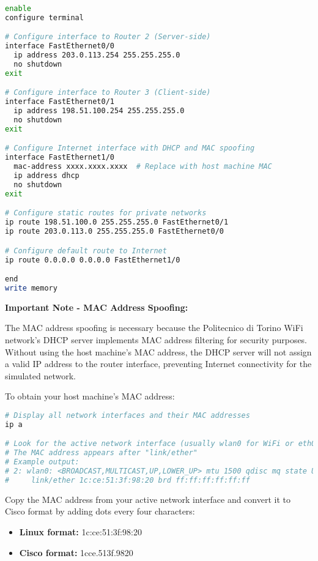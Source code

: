 \begin{lstlisting}[language=bash]
enable
configure terminal

# Configure interface to Router 2 (Server-side)
interface FastEthernet0/0
  ip address 203.0.113.254 255.255.255.0
  no shutdown
exit

# Configure interface to Router 3 (Client-side)  
interface FastEthernet0/1
  ip address 198.51.100.254 255.255.255.0
  no shutdown
exit

# Configure Internet interface with DHCP and MAC spoofing
interface FastEthernet1/0
  mac-address xxxx.xxxx.xxxx  # Replace with host machine MAC
  ip address dhcp
  no shutdown
exit

# Configure static routes for private networks
ip route 198.51.100.0 255.255.255.0 FastEthernet0/1
ip route 203.0.113.0 255.255.255.0 FastEthernet0/0

# Configure default route to Internet
ip route 0.0.0.0 0.0.0.0 FastEthernet1/0

end
write memory
\end{lstlisting}

\noindent
\textbf{Important Note - MAC Address Spoofing:} 

\noindent
The MAC address spoofing is necessary because the Politecnico di Torino WiFi network's DHCP server implements MAC address filtering for security purposes. Without using the host machine's MAC address, the DHCP server will not assign a valid IP address to the router interface, preventing Internet connectivity for the simulated network.

\noindent
To obtain your host machine's MAC address:

\begin{lstlisting}[language=bash]
# Display all network interfaces and their MAC addresses
ip a

# Look for the active network interface (usually wlan0 for WiFi or eth0 for Ethernet)
# The MAC address appears after "link/ether"
# Example output:
# 2: wlan0: <BROADCAST,MULTICAST,UP,LOWER_UP> mtu 1500 qdisc mq state UP group default qlen 1000
#     link/ether 1c:ce:51:3f:98:20 brd ff:ff:ff:ff:ff:ff
\end{lstlisting}

Copy the MAC address from your active network interface and convert it to Cisco format by adding dots every four characters:
\begin{itemize}
    \item \textbf{Linux format:} 1c:ce:51:3f:98:20
    \item \textbf{Cisco format:} 1cce.513f.9820
\end{itemize}

